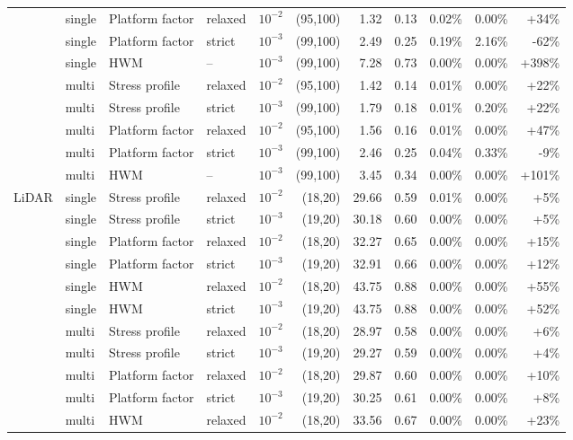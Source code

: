 \begin{table}[ht]
{\begin{tabular}{llllrrrrrrr}
 & single & Platform factor & relaxed & $10^{-2}$ & (95,100) & 1.32 & 0.13 & 0.02\% & 0.00\% & +34\% \\
 & single & Platform factor & strict & $10^{-3}$ & (99,100) & 2.49 & 0.25 & 0.19\% & 2.16\% & -62\% \\
 & single & HWM & -- & $10^{-3}$ & (99,100) & 7.28 & 0.73 & 0.00\% & 0.00\% & +398\% \\
 & multi & Stress profile & relaxed & $10^{-2}$ & (95,100) & 1.42 & 0.14 & 0.01\% & 0.00\% & +22\% \\
 & multi & Stress profile & strict & $10^{-3}$ & (99,100) & 1.79 & 0.18 & 0.01\% & 0.20\% & +22\% \\
 & multi & Platform factor & relaxed & $10^{-2}$ & (95,100) & 1.56 & 0.16 & 0.01\% & 0.00\% & +47\% \\
 & multi & Platform factor & strict & $10^{-3}$ & (99,100) & 2.46 & 0.25 & 0.04\% & 0.33\% & -9\% \\
 & multi & HWM & -- & $10^{-3}$ & (99,100) & 3.45 & 0.34 & 0.00\% & 0.00\% & +101\% \\
\midrule
LiDAR & single & Stress profile & relaxed & $10^{-2}$ & (18,20) & 29.66 & 0.59 & 0.01\% & 0.00\% & +5\% \\
 & single & Stress profile & strict & $10^{-3}$ & (19,20) & 30.18 & 0.60 & 0.00\% & 0.00\% & +5\% \\
 & single & Platform factor & relaxed & $10^{-2}$ & (18,20) & 32.27 & 0.65 & 0.00\% & 0.00\% & +15\% \\
 & single & Platform factor & strict & $10^{-3}$ & (19,20) & 32.91 & 0.66 & 0.00\% & 0.00\% & +12\% \\
 & single & HWM & relaxed & $10^{-2}$ & (18,20) & 43.75 & 0.88 & 0.00\% & 0.00\% & +55\% \\
 & single & HWM & strict & $10^{-3}$ & (19,20) & 43.75 & 0.88 & 0.00\% & 0.00\% & +52\% \\
 & multi & Stress profile & relaxed & $10^{-2}$ & (18,20) & 28.97 & 0.58 & 0.00\% & 0.00\% & +6\% \\
 & multi & Stress profile & strict & $10^{-3}$ & (19,20) & 29.27 & 0.59 & 0.00\% & 0.00\% & +4\% \\
 & multi & Platform factor & relaxed & $10^{-2}$ & (18,20) & 29.87 & 0.60 & 0.00\% & 0.00\% & +10\% \\
 & multi & Platform factor & strict & $10^{-3}$ & (19,20) & 30.25 & 0.61 & 0.00\% & 0.00\% & +8\% \\
 & multi & HWM & relaxed & $10^{-2}$ & (18,20) & 33.56 & 0.67 & 0.00\% & 0.00\% & +23\% \\

\end{tabular}}
\end{table}
